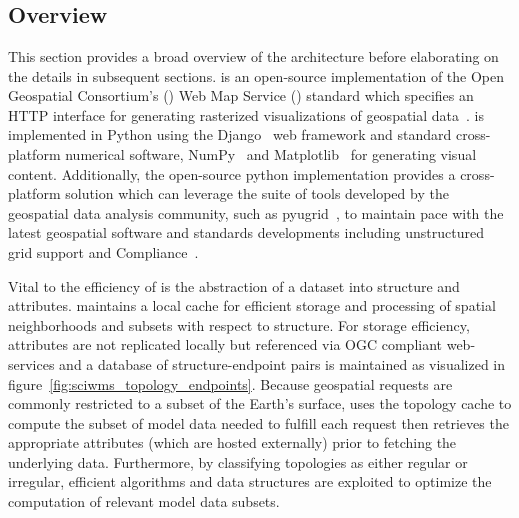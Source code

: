 \section{\sciwms{}}
\label{sec:sciwms}

\subsection{Overview}
This section provides a broad overview of the \sciwms{} architecture
before elaborating on the details in subsequent sections. \Sciwms{} is
an open-source implementation of the Open Geospatial Consortium's
(\ogc{}) Web Map Service (\wms{}) standard which specifies an HTTP
interface for generating rasterized visualizations of geospatial
data~\cite{wms14}. \sciwms{} is implemented in Python using the
Django~\cite{django} web framework and standard cross-platform
numerical software, NumPy~\cite{numpy11} and
Matplotlib~\cite{hunter07} for generating visual
content. Additionally, the open-source python implementation provides
a cross-platform \wms{} solution which can leverage the suite of tools
developed by the geospatial data analysis community, such as
pyugrid~\cite{pyugrid}, to maintain pace with the latest geospatial
software and standards developments including unstructured grid
support and \cfugrid{} Compliance~\cite{cfugrid}.



Vital to the efficiency of \sciwms{} is the abstraction of a dataset
into structure and attributes. \Sciwms{} maintains a local cache for
efficient storage and processing of spatial neighborhoods and subsets
with respect to structure. For storage efficiency, attributes are not
replicated locally but referenced via OGC compliant web-services and a
database of structure-endpoint pairs is maintained as visualized in
figure~\ref{fig:sciwms_topology_endpoints}. Because geospatial \wms{}
requests are commonly restricted to a subset of the Earth's surface,
\sciwms{} uses the topology cache to compute the subset of model data
needed to fulfill each request then retrieves the appropriate
attributes (which are hosted externally) prior to fetching the
underlying data. Furthermore, by classifying topologies as either
regular or irregular, efficient algorithms and data structures are
exploited to optimize the computation of relevant model data subsets.

